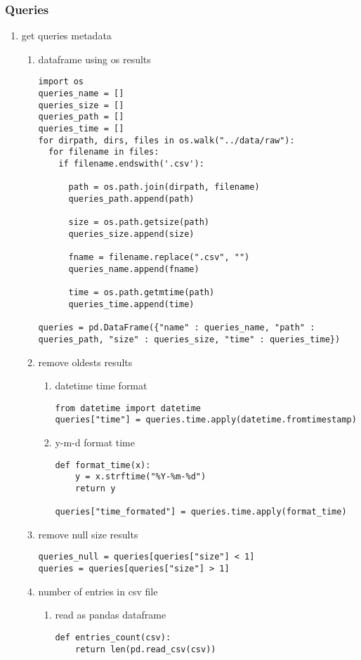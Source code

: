 \documentclass[11pt]{article}
\begin{document}
\subsubsection{Queries}
\label{sec:orgdd08e1e}
\begin{enumerate}
\item get queries metadata
\label{sec:orgdb4db68}
\begin{enumerate}
\item dataframe using os results
\label{sec:org878c805}
\begin{verbatim}
import os
queries_name = []
queries_size = []
queries_path = []
queries_time = []
for dirpath, dirs, files in os.walk("../data/raw"): 
  for filename in files:
    if filename.endswith('.csv'):

      path = os.path.join(dirpath, filename)
      queries_path.append(path)

      size = os.path.getsize(path)
      queries_size.append(size)

      fname = filename.replace(".csv", "")
      queries_name.append(fname)

      time = os.path.getmtime(path)
      queries_time.append(time)

queries = pd.DataFrame({"name" : queries_name, "path" : queries_path, "size" : queries_size, "time" : queries_time})      
\end{verbatim}
\item remove oldests results
\label{sec:org39c32e2}
\begin{enumerate}
\item datetime time format
\label{sec:org9b8ba40}
\begin{verbatim}
from datetime import datetime
queries["time"] = queries.time.apply(datetime.fromtimestamp)
\end{verbatim}

\item y-m-d format time
\label{sec:org9a76254}
\begin{verbatim}
def format_time(x):
    y = x.strftime("%Y-%m-%d")
    return y

queries["time_formated"] = queries.time.apply(format_time)
\end{verbatim}
\end{enumerate}
\item remove null size results
\label{sec:org2a096bd}
\begin{verbatim}
queries_null = queries[queries["size"] < 1]
queries = queries[queries["size"] > 1]
\end{verbatim}
\item number of entries in csv file
\label{sec:orge458d42}
\begin{enumerate}
\item read as pandas dataframe
\label{sec:org21e8f7e}
\begin{verbatim}
def entries_count(csv):
    return len(pd.read_csv(csv))


\end{verbatim}
\end{enumerate}
\end{enumerate}
\end{enumerate}
\end{document}
